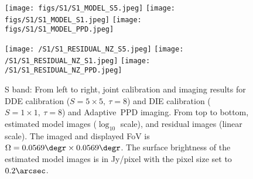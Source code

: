 \begin{figure*}

\begin{minipage}[t]{0.9\linewidth}
\centering
\texttt{[image: figs/S1/S1\_MODEL\_S5.jpeg]}
\texttt{[image: figs/S1/S1\_MODEL\_S1.jpeg]}
\texttt{[image: figs/S1/S1\_MODEL\_PPD.jpeg]}

\texttt{[image: /S1/S1\_RESIDUAL\_NZ\_S5.jpeg]}
\texttt{[image: /S1/S1\_RESIDUAL\_NZ\_S1.jpeg]}
\texttt{[image: /S1/S1\_RESIDUAL\_NZ\_PPD.jpeg]}
\end{minipage}
\caption{S band: From left to right, joint calibration and imaging results for DDE calibration ($S =5\times 5,~\tau =8$) and DIE calibration ($S =1\times 1,~\tau =8$) and {Adaptive~PPD} imaging.
From top to bottom, estimated model images ($\log_{10}$ scale), and residual images (linear scale). {{The imaged and displayed FoV is $\Omega= 0.0569\degr \times 0.0569\degr$}}. The surface brightness of the estimated model images is in Jy/pixel with the pixel size set to $0.2\arcsec$.}
\label{fig:s1_maps}

\end{figure*}
